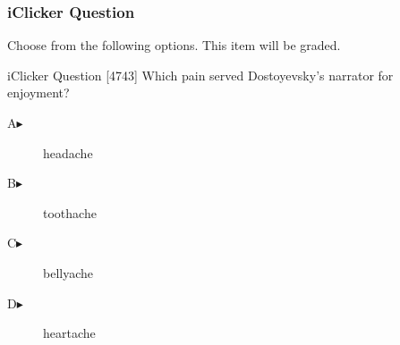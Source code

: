 \begin{frame}
  \frametitle{iClicker Question}
Choose from the following options. This item will be graded.
\begin{block}{iClicker Question}
[4743] Which pain served Dostoyevsky's narrator for enjoyment?
\end{block}
\begin{description}
\item[A\hspace{.2in}$\blacktriangleright$] headache
\item[B\hspace{.2in}$\blacktriangleright$] toothache
\item[C\hspace{.2in}$\blacktriangleright$] bellyache
\item[D\hspace{.2in}$\blacktriangleright$] heartache
\end{description}
\end{frame}
